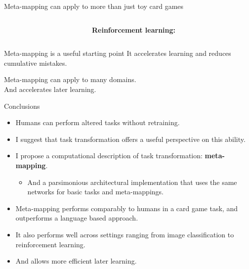 \documentclass{beamer}
\begin{document}
\begin{frame}{Meta-mapping can apply to more than just toy card games}
\begin{columns}
\begin{column}{0.5\textwidth}
{\begin{tikzpicture}[auto, scale=0.8, every node/.style={scale=0.8}]
\end{tikzpicture}
}
\end{column}%
\vspace{0.2\textheight}
\begin{column}{0.5\textwidth}
\textbf{Reinforcement learning:}
\end{column}

\end{columns}

\end{frame}

\begin{frame}{Meta-mapping is a useful starting point}
It accelerates learning and reduces cumulative mistakes.
{
\centering
{}
}
\end{frame}

\begin{frame}[standout]
Meta-mapping can apply to many domains.\\[1em]
And accelerates later learning.
\end{frame}

\begin{frame}{Conclusions}

\begin{itemize}[<+->]
\item Humans can perform altered tasks without retraining. 
\item I suggest that task transformation offers a useful perspective on this ability. 
\item I propose a computational description of task transformation: \textbf{meta-mapping}.
    \begin{itemize}
        \item And a parsimonious architectural implementation that uses the same networks for basic tasks and meta-mappings. 
    \end{itemize}
\item Meta-mapping performs comparably to humans in a card game task, and outperforms a language based approach.
\item It also performs well across settings ranging from image classification to reinforcement learning.
\item And allows more efficient later learning. 
\end{itemize}
\end{frame}
\end{document}
